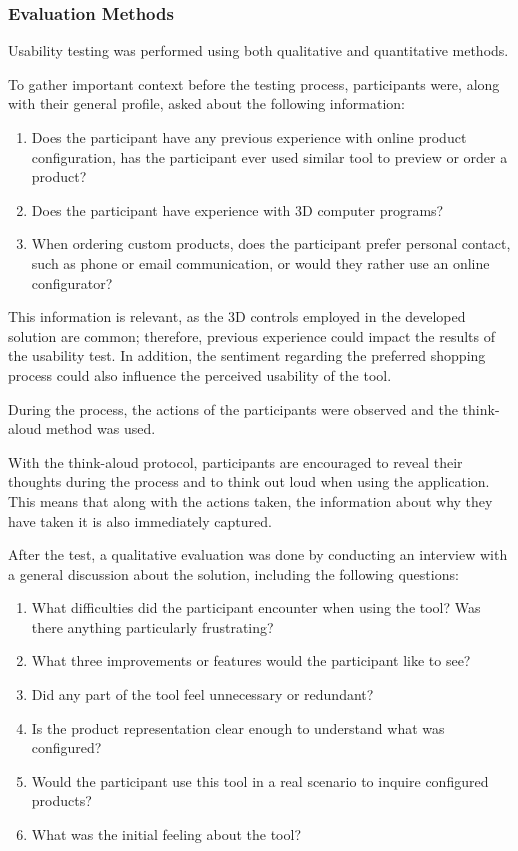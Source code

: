 \subsubsection{Evaluation Methods}

Usability testing was performed using both qualitative and quantitative methods.

To gather important context before the testing process, participants were, along with their general profile, asked about the following information: 
\begin{enumerate}
    \item Does the participant have any previous experience with online product configuration, has the participant ever used similar tool to preview or order a product?
    \item Does the participant have experience with 3D computer programs?
    \item When ordering custom products, does the participant prefer personal contact, such as phone or email communication, or would they rather use an online configurator?
\end{enumerate}
This information is relevant, as the 3D controls employed in the developed solution are common; therefore, previous experience could impact the results of the usability test. In addition, the sentiment regarding the preferred shopping process could also influence the perceived usability of the tool.

During the process, the actions of the participants were observed and the think-aloud method was used.

With the think-aloud protocol, participants are encouraged to reveal their thoughts during the process and to think out loud when using the application. This means that along with the actions taken, the information about why they have taken it is also immediately captured. \cite{Moran2019}

After the test, a qualitative evaluation was done by conducting an interview with a general discussion about the solution, including the following questions:
\begin{enumerate}
    \item What difficulties did the participant encounter when using the tool? Was there anything particularly frustrating?
    \item What three improvements or features would the participant like to see?
    \item Did any part of the tool feel unnecessary or redundant?
    \item Is the product representation clear enough to understand what was configured?
    \item Would the participant use this tool in a real scenario to inquire configured products?
    \item What was the initial feeling about the tool?
\end{enumerate}

